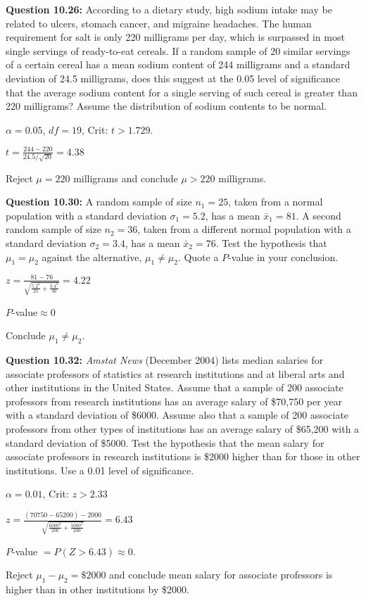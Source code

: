 \documentclass{article}
\begin{document}
\textbf{Question 10.26:}
According to a dietary study, high sodium intake 
may be related to ulcers, stomach cancer, and
migraine headaches. The human requirement for salt
is only 220 milligrams per day, which is surpassed in
most single servings of ready-to-eat cereals. If a 
random sample of 20 similar servings of a certain cereal
has a mean sodium content of 244 milligrams and a
standard deviation of 24.5 milligrams, does this 
suggest at the 0.05 level of significance that the average
sodium content for a single serving of such cereal is
greater than 220 milligrams? Assume the distribution
of sodium contents to be normal.
\begin{description}
    \item $\alpha = 0.05$, $df = 19$, Crit: $t > 1.729$.
    \item $t = \frac{244-220}{24.5/\sqrt{20}} = 4.38$
    \item Reject $\mu=220$ milligrams and conclude $\mu>220$ milligrams.
\end{description}

\textbf{Question 10.30:}
A random sample of size $n_1 = 25$, taken from a
normal population with a standard deviation $\sigma_1 = 5.2$,
has a mean $\bar{x}_1 = 81$. A second random sample of size
$n_2 = 36$, taken from a different normal population with
a standard deviation $\sigma_2 = 3.4$, has a mean $\bar{x}_2 = 76$.
Test the hypothesis that $\mu_1 = \mu_2$ against the alternative, 
$\mu_1 \not= \mu_2$. Quote a $P$-value in your conclusion.
\begin{description}
    \item $z=\frac{81-76}{\sqrt{\frac{5.2^2}{25}+\frac{3.4^2}{36}}} = 4.22$
    \item $P$-value$\approx 0$
    \item Conclude $\mu_1 \not= \mu_2$.
\end{description}

\textbf{Question 10.32:}
\textit{Amstat News} (December 2004) lists median
salaries for associate professors of statistics at research
institutions and at liberal arts and other institutions
in the United States. Assume that a sample of 200
associate professors from research institutions has an
average salary of \$70,750 per year with a standard 
deviation of \$6000. Assume also that a sample of 200 
associate professors from other types of institutions has
an average salary of \$65,200 with a standard deviation
of \$5000. Test the hypothesis that the mean salary
for associate professors in research institutions is \$2000
higher than for those in other institutions. Use a 0.01
level of significance.
\begin{description}
    \item $\alpha=0.01$, Crit: $z > 2.33$
    \item $z = \frac{(70750-65200)-2000}{\sqrt{\frac{6000^2}{200}+\frac{5000^2}{200}}} = 6.43$
    \item $P$-value $= P(Z>6.43)\approx 0$.
    \item Reject $\mu_1-\mu_2=\$2000$ and conclude mean salary for associate professors is higher than
    in other institutions by \$2000.
\end{description}
\end{document}
